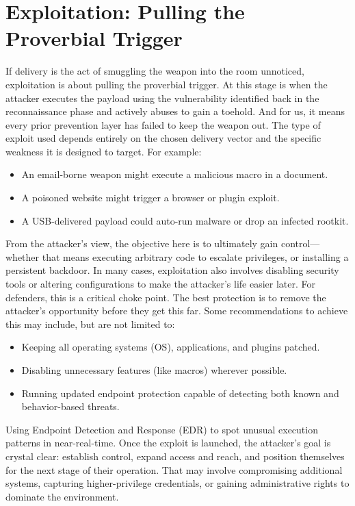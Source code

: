 \section{Exploitation: Pulling the Proverbial Trigger
}If delivery is the act of smuggling the weapon into the room unnoticed, exploitation is about pulling the proverbial trigger. At this stage is when the attacker executes the payload using the vulnerability identified back in the reconnaissance phase and actively abuses to gain a toehold. And for us, it means every prior prevention layer has failed to keep the weapon out.
The type of exploit used depends entirely on the chosen delivery vector and the specific weakness it is designed to target. For example:

\begin{itemize}
    \item An email-borne weapon might execute a malicious macro in a document.
    \item A poisoned website might trigger a browser or plugin exploit.
    \item A USB-delivered payload could auto-run malware or drop an infected rootkit.
\end{itemize}

From the attacker's view, the objective here is to ultimately gain control—whether that means executing arbitrary code to escalate privileges, or installing a persistent backdoor. In many cases, exploitation also involves disabling security tools or altering configurations to make the attacker's life easier later.
For defenders, this is a critical choke point. The best protection is to remove the attacker's opportunity before they get this far. Some recommendations to achieve this may include, but are not limited to:

\begin{itemize}
    \item Keeping all operating systems (OS), applications, and plugins patched.
    \item Disabling unnecessary features (like macros) wherever possible.
    \item Running updated endpoint protection capable of detecting both known and behavior-based threats.
\end{itemize}

Using Endpoint Detection and Response (EDR) to spot unusual execution patterns in near-real-time. Once the exploit is launched, the attacker's goal is crystal clear: establish control, expand access and reach, and position themselves for the next stage of their operation. That may involve compromising additional systems, capturing higher-privilege credentials, or gaining administrative rights to dominate the environment.

